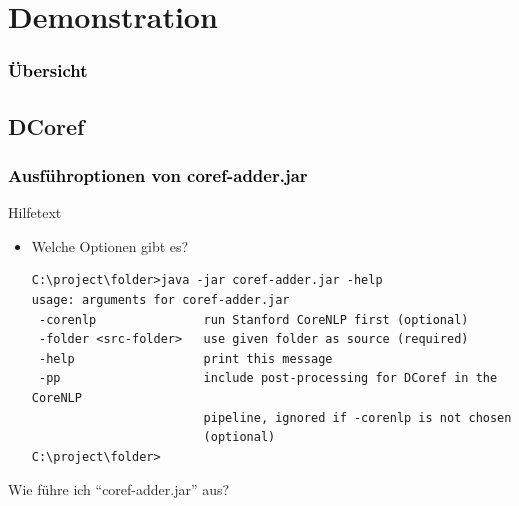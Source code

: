 \documentclass[xcolor=dvipsnames]{beamer}
\begin{document}
\section{Demonstration}


\begin{frame}[plain]\frametitle{\textcolor{black}{Übersicht}}


\end{frame}

\addtocounter{framenumber}{-3}

\subsection{DCoref}


\begin{frame}[fragile]\frametitle{\textcolor{black}{Ausführoptionen von coref-adder.jar}}

\begin{block}{Hilfetext}
\begin{itemize}
\item Welche Optionen gibt es?
\begin{scriptsize}\begin{verbatim}
C:\project\folder>java -jar coref-adder.jar -help
usage: arguments for coref-adder.jar
 -corenlp               run Stanford CoreNLP first (optional)
 -folder <src-folder>   use given folder as source (required)
 -help                  print this message
 -pp                    include post-processing for DCoref in the CoreNLP
                        pipeline, ignored if -corenlp is not chosen
                        (optional)
C:\project\folder>
\end{verbatim}
\end{scriptsize}
\end{itemize}
\end{block}

\begin{block}{Wie führe ich ``coref-adder.jar'' aus?}
\end{block}

\end{frame}

\end{document}
